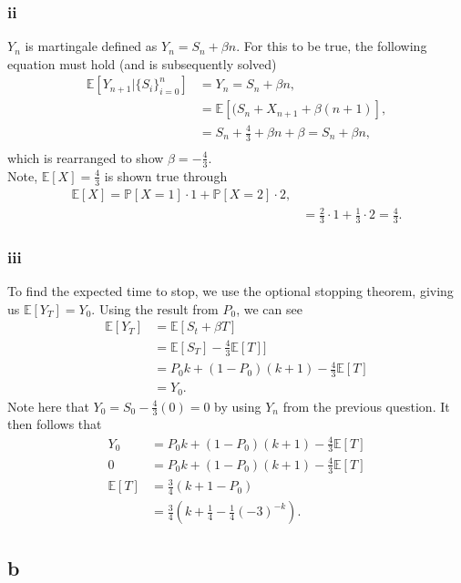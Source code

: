 \documentclass{article}
\newcommand{\E}{\mathbb{E}}
\begin{document}
\subsubsection{ii}
$Y_n$ is martingale defined as $Y_n = S_n +\beta n$. For this to be true, the following equation must hold (and is subsequently solved)
\begin{align}
     \mathbb{E}[Y_{n+1}\vert\{S_i\}_{i=0}^n] &= Y_n = S_n+\beta n,\\
     &=  \mathbb{E}[(S_n+X_{n+1} + \beta(n+1)],\\
     &= S_n + \frac{4}{3} + \beta n + \beta = S_n+\beta n,\\
\end{align}
which is rearranged to show $\beta=-\frac{4}{3}$.\\
Note, $ \mathbb{E}[X] = \frac{4}{3}$ is shown true through
\begin{align}
     \mathbb{E}[X] = \mathbb{P}[X=1]\cdot  1 + \mathbb{P}[X=2] \cdot 2,\\
     &= \frac{2}{3}\cdot 1 + \frac{1}{3}\cdot 2 = \frac{4}{3}.
\end{align}
\subsubsection{iii}
To find the expected time to stop, we use the optional stopping theorem, giving us $\E[Y_T] = Y_0$. Using the result from $P_0$, we can see 
\begin{align}
    \E[Y_T] &= \E[S_t+\beta T] \\
    &= \E[S_T] - \frac{4}{3}\E[T]] \\
    &= P_0k + (1-P_0)(k+1) - \frac{4}{3}\E[T] \\
    &=Y_0.
\end{align}
Note here that $Y_0 = S_0 - \frac{4}{3}(0) = 0$ by using $Y_n$ from the previous question. It then follows that
\begin{align}
    Y_0 &= P_0k + (1-P_0)(k+1) - \frac{4}{3}\E[T] \\
    0 &= P_0k + (1-P_0)(k+1) - \frac{4}{3}\E[T] \\
    \E[T] &= \frac{3}{4}(k+1-P_0) \\
    &= \frac{3}{4}\left(k + \frac{1}{4} - \frac{1}{4}(-3)^{-k}\right).
\end{align}

\subsection{b}
\end{document}
